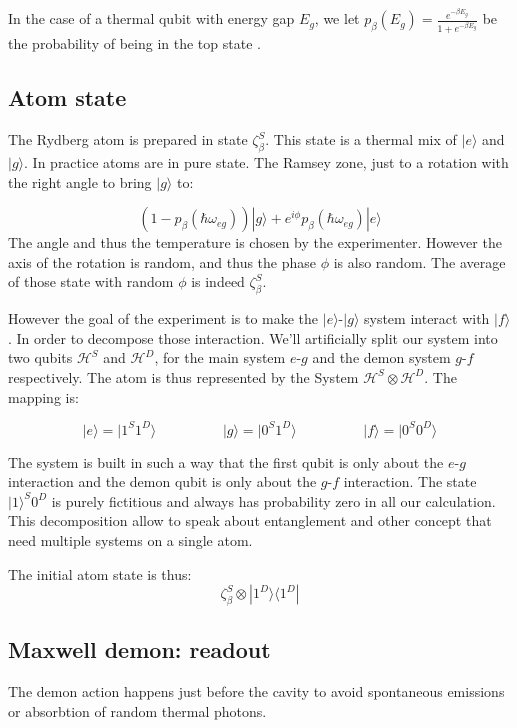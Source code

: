 \documentclass[10pt]{report}
\theoremstyle{plain}
\theoremstyle{definition}
\theoremstyle{remark}
\newcommand{\ket}[1]{|#1\rangle}
\newcommand{\bra}[1]{\langle#1|}
\begin{document}
In the case of a thermal qubit with energy gap $E_g$, we let $p_\beta(E_g) =\frac
{e^{-\beta E_g}}{1 + e^{-\beta E_g}} $ be the probability of being in the top state .

\subsection{Atom state}

The Rydberg atom is prepared in state $\zeta_\beta^S$. This state is a thermal
mix of $\ket e$ and $\ket g$. In practice atoms are in pure state. The Ramsey
zone, just to a rotation with the right angle to bring $\ket g$ to:

\[(1-p_\beta(\hbar \omega_{eg}))\ket g +
e^{i\phi}p_\beta(\hbar \omega_{eg}) \ket e\]
The angle and thus the temperature is chosen by the experimenter. However the
axis of the rotation is random, and thus the phase $\phi$ is also random. The
average of those state with random $\phi$ is indeed $\zeta_\beta^S$.

However the goal of the experiment is to make the $\ket e$-$\ket g$ system
interact with $\ket f$. In order to decompose those interaction. We'll
artificially split our system into two qubits $\mathcal{H}^S$ and $\mathcal{H}^D$, for the
main system $e$-$g$ and the demon system $g$-$f$ respectively. The atom is thus
represented by the System $\mathcal{H}^S \otimes \mathcal{H}^D$. The mapping is:

\[\ket e = \ket {1^S1^D} \hspace{2cm} \ket g = \ket{0^S1^D} \hspace{2cm} \ket f
  = \ket{0^S0^D}\]

The system is built in such a way that the first qubit is only about the $e$-$g$
interaction and the demon qubit is only about the $g$-$f$ interaction. The state
$\ket 1^S0^D$ is purely fictitious and always has probability zero in all our
calculation. This decomposition allow to speak about entanglement and other
concept that need multiple systems on a single atom.

The initial atom state is thus:
\[\zeta_\beta^S \otimes \ket {1^D} \bra {1^D}\]

\subsection{Maxwell demon: readout}

The demon action happens just before the cavity to avoid spontaneous emissions or
absorbtion of random thermal photons.
\end{document}
